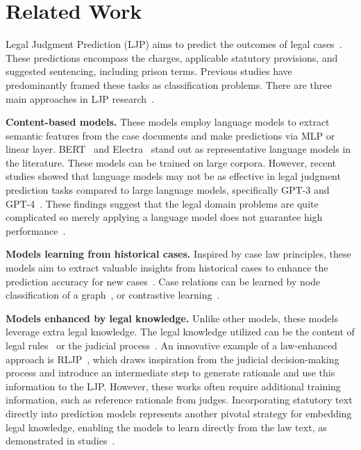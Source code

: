 \section{Related Work} \label{rw}


Legal Judgment Prediction (LJP) aims to predict the outcomes of legal cases~\cite{chalkidis-etal-2019-neural, an-etal-2022-charge}. These predictions encompass the charges, applicable statutory provisions, and suggested sentencing, including prison terms. Previous studies have predominantly framed these tasks as classification problems. There are three main approaches in LJP research~\cite{DBLP:journals/access/CuiSW23}.

\textbf{Content-based models.} 
These models employ language models to extract semantic features from the case documents and make predictions via MLP or linear layer. BERT~\cite{devlin-etal-2019-bert} and Electra~\cite{DBLP:conf/iclr/ClarkLLM20} stand out as representative language models in the literature. These models can be trained on large corpora. However, recent studies showed that language models may not be as effective in legal judgment prediction tasks compared to large language models, specifically GPT-3 and GPT-4~\cite{shui-etal-2023-comprehensive, wu-etal-2023-precedent}. These findings suggest that the legal domain problems are quite complicated so merely applying a language model does not guarantee high performance~\cite{vats-etal-2023-llms}.

\textbf{Models learning from historical cases.} 
Inspired by case law principles, these models aim to extract valuable insights from historical cases to enhance the prediction accuracy for new cases~\cite{DBLP:conf/cicai/ZhouLWKZW22}. Case relations can be learned by node classification of a graph~\cite{Rformer}, or contrastive learning~\cite{liu-etal-2022-augmenting}. 

\textbf{Models enhanced by legal knowledge.} 
Unlike other models, these models leverage extra legal knowledge. The legal knowledge utilized can be the content of legal rules~\cite{ML-LJP} or the judicial process~\cite{DBLP:conf/emnlp/ZhongGTX0S18,deng-etal-2023-syllogistic}. An innovative example of a law-enhanced approach is RLJP~\cite{Wu2022TowardsIA}, which draws inspiration from the judicial decision-making process and introduce an intermediate step to generate rationale and use this information to the LJP. However, these works often require additional training information, such as reference rationale from judges. Incorporating statutory text directly into prediction models represents another pivotal strategy for embedding legal knowledge, enabling the models to learn directly from the law text, as demonstrated in studies~\cite{neurjudge,ML-LJP}. 

